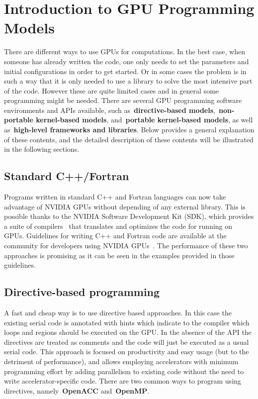 \section{Introduction to GPU Programming Models}


\par
There are different ways to use GPUs for computations.
In the best case, when someone has already written the code, one only needs to set the parameters and initial configurations in order to get started.
Or in some cases the problem is in such a way that it is only needed to use a library to solve the most intensive part of the code.
However these are quite limited cases and in general some programming might be needed.
There are several GPU programming software environments and APIs available, such as~\textbf{directive-based models},~\textbf{non-portable kernel-based models}, and~\textbf{portable kernel-based models}, as well as~\textbf{high-level frameworks and libraries}.
Below provides a general explanation of these contents, and the detailed description of these contents will be illustrated in the following sections.


\subsection{Standard C++/Fortran}


\par
Programs written in standard C++ and Fortran languages can now take advantage of NVIDIA GPUs without depending of any external library.
This is possible thanks to the NVIDIA Software Development Kit (SDK), which provides a suite of compilers~\cite{NVIDIA_SDK} that translates and optimizes the code for running on GPUs.
Guidelines for writing C++ and Fortran code are available at the community for developers using NVIDIA GPUs~\cite{guideline_gpu_cpp, guideline_gpu_fortran}.
The performance of these two approaches is promising as it can be seen in the examples provided in those guidelines.




\subsection{Directive-based programming}


\par
A fast and cheap way is to use directive based approaches.
In this case the existing serial code is annotated with hints which indicate to the compiler which loops and regions should be executed on the GPU.
In the absence of the API the directives are treated as comments and the code will just be executed as a usual serial code.
This approach is focused on productivity and easy usage (but to the detriment of performance), and allows employing accelerators with minimum programming effort by adding parallelism to existing code without the need to write accelerator-specific code.
There are two common ways to program using directives, namely~\textbf{OpenACC} and~\textbf{OpenMP}.


